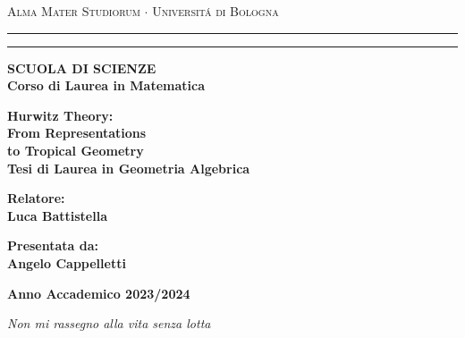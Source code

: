 \documentclass[12pt,a4paper,openright,twoside]{report}
\theoremstyle{definition} %
\begin{document}
	\begin{titlepage}
		\begin{center}
			{{\Large{\textsc{Alma Mater Studiorum $\cdot$ Universit\'a di
							Bologna}}}} \rule[0.1cm]{15.8cm}{0.1mm}
			\rule[0.5cm]{15.8cm}{0.6mm}
			{\small{\bf SCUOLA DI SCIENZE\\
					Corso di Laurea in Matematica}}
		\end{center}
		\vspace{15mm}
		\begin{center}
			\vspace{3mm}
			{\LARGE{\bf Hurwitz Theory: \bigskip \\
                         From Representations\\[0.8cm]
                          to Tropical Geometry}}\\
			\vspace{1mm}
			\vspace{28mm} {\large{\bf Tesi di Laurea in Geometria Algebrica}}
		\end{center}
		\vspace{50mm}
		\par
		\noindent
		\begin{minipage}[t]{0.47\textwidth}
			{\large{\bf Relatore:\\
					Luca Battistella}}
		\end{minipage}
		\hfill
		\begin{minipage}[t]{0.47\textwidth}\raggedleft
			{\large{\bf Presentata da:\\
					Angelo Cappelletti}}
		\end{minipage}
		\vspace{17mm}
		\begin{center}
			{\large{\bf Anno Accademico 2023/2024}}
		\end{center}
	\end{titlepage}
	\clearpage{\pagestyle{empty}\cleardoublepage}
	
\newpage




\clearpage{\pagestyle{empty}\cleardoublepage}
\begin{titlepage}
	\topmargin=6.5cm
	\raggedleft
	\large
	\em
	\textit{Non mi rassegno alla vita senza lotta}\\
	\clearpage{\pagestyle{empty}\cleardoublepage}
\end{titlepage}
\end{document}
